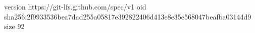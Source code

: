 version https://git-lfs.github.com/spec/v1
oid sha256:2f9933536bea7dad255a05817e392822406d413e8e35e568047beafba03144d9
size 92
